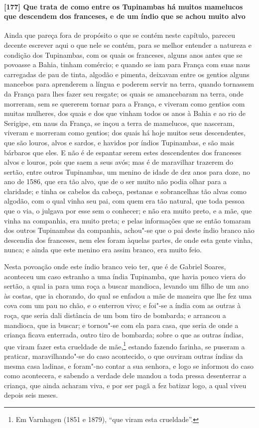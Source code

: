 \paragraph{[177] Que trata de como entre os Tupinambas há muitos mamelucos que descendem dos
franceses, e de um índio que se achou muito alvo}\quad
Ainda que pareça fora de propósito o que se contém neste capítulo, pareceu decente
escrever aqui o que nele se contém, para se melhor entender a natureza e condição dos
Tupinambas, com os quais os franceses, alguns anos antes que se povoasse a Bahia, tinham
comércio; e quando se iam para França com suas naus carregadas de pau de tinta, algodão e
pimenta, deixavam entre os gentios alguns mancebos para aprenderem a língua e poderem
servir na terra, quando tornassem da França para lhes fazer seu resgate; os quais se
amancebaram na terra, onde morreram, sem se quererem tornar para a França, e viveram como
gentios com muitas mulheres, dos quais e dos que vinham todos os anos à Bahia e ao rio de
Serigipe, em naus da França, se inçou a terra de mamelucos, que nasceram, viveram e
morreram como gentios; dos quais há hoje muitos seus descendentes, que são louros, alvos e
sardos, e havidos por índios Tupinambas, e são mais bárbaros que eles. E não é de espantar
serem estes descendentes dos franceses alvos e louros, pois que saem a seus avós; mas é de
maravilhar trazerem do sertão, entre outros Tupinambas, um menino de idade de dez anos
para doze, no ano de 1586, que era tão alvo, que de o ser muito não podia olhar para a
claridade; e tinha os cabelos da cabeça, pestanas e sobrancelhas tão alvas como algodão,
com o qual vinha seu pai, com quem era tão natural, que toda pessoa que o via, o julgava
por esse sem o conhecer; e não era muito preto, e a mãe, que vinha na companhia, era muito
preta; e pelas informações que se então tomaram dos outros Tupinambas da companhia,
achou"-se que o pai deste índio branco não descendia dos franceses, nem eles foram àquelas
partes, de onde esta gente vinha, nunca; e ainda que este menino era assim branco, era
muito feio.

Nesta povoação onde este índio branco veio ter, que é de Gabriel Soares, aconteceu um caso
estranho a uma índia Tupinamba, que havia pouco viera do sertão, a qual ia para uma roça a
buscar mandioca, levando um filho de um ano às costas, que ia chorando, do qual se enfadou
a mãe de maneira que lhe fez uma cova com um pau no chão, e o enterrou vivo; e foi"-se a
índia com as outras à roça, que seria dali distância de um bom tiro de bombarda; e
arrancou a mandioca, que ia buscar; e tornou"-se com ela para casa, que seria de onde a
criança ficava enterrada, outro tiro de bombarda; sobre o que as outras índias, que viram
fazer esta crueldade de mãe,\footnote{ Em Varnhagen (1851 e 1879), ``que viram esta
crueldade''.} estando fazendo farinha, se puseram a praticar, maravilhando"-se do caso
acontecido, o que ouviram outras índias da mesma casa ladinas, e foram"-no contar a sua
senhora, e logo se informou do caso como acontecera, e sabendo a verdade dele mandou a
toda pressa desenterrar a criança, que ainda acharam viva, e por ser pagã a fez batizar
logo, a qual viveu depois seis meses.


